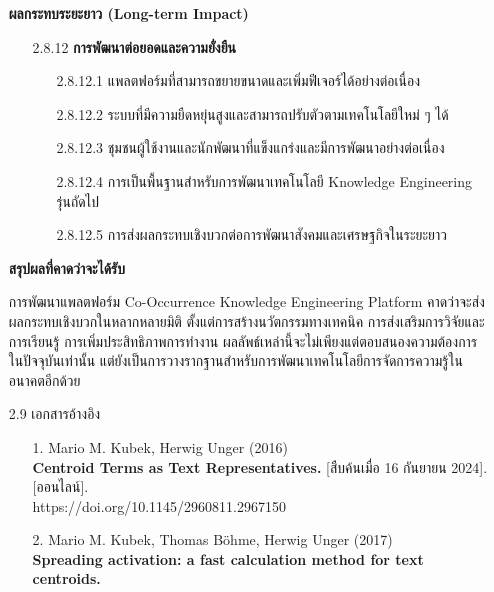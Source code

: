 \documentclass[12pt,a4paper]{article}
\newcommand{\textlight}[1]{{\thailightfont #1}}
\begin{document}
\begin{enumerate}[leftmargin=2cm]
{        \vspace{0.8cm}

        \textbf{ผลกระทบระยะยาว (Long-term Impact)}

        \begin{enumerate}
            \item[2.8.12] \textbf{การพัฒนาต่อยอดและความยั่งยืน}
            \begin{enumerate}
                \item[2.8.12.1] แพลตฟอร์มที่สามารถขยายขนาดและเพิ่มฟีเจอร์ได้อย่างต่อเนื่อง
                \item[2.8.12.2] ระบบที่มีความยืดหยุ่นสูงและสามารถปรับตัวตามเทคโนโลยีใหม่ ๆ ได้
                \item[2.8.12.3] ชุมชนผู้ใช้งานและนักพัฒนาที่แข็งแกร่งและมีการพัฒนาอย่างต่อเนื่อง
                \item[2.8.12.4] การเป็นพื้นฐานสำหรับการพัฒนาเทคโนโลยี Knowledge Engineering รุ่นถัดไป
                \item[2.8.12.5] การส่งผลกระทบเชิงบวกต่อการพัฒนาสังคมและเศรษฐกิจในระยะยาว
            \end{enumerate}
        \end{enumerate}

        \vspace{0.5cm}

        \textbf{สรุปผลที่คาดว่าจะได้รับ}

        \hspace{1cm}การพัฒนาแพลตฟอร์ม Co-Occurrence Knowledge Engineering Platform คาดว่าจะส่งผลกระทบเชิงบวกในหลากหลายมิติ ตั้งแต่การสร้างนวัตกรรมทางเทคนิค การส่งเสริมการวิจัยและการเรียนรู้ การเพิ่มประสิทธิภาพการทำงาน ผลลัพธ์เหล่านี้จะไม่เพียงแต่ตอบสนองความต้องการในปัจจุบันเท่านั้น แต่ยังเป็นการวางรากฐานสำหรับการพัฒนาเทคโนโลยีการจัดการความรู้ในอนาคตอีกด้วย
    }

    \vspace{3cm}

    \item[2.9] เอกสารอ้างอิง
    \\
    \textlight{
        \begin{enumerate}
            \item[1.] Mario M. Kubek, Herwig Unger (2016) \\
            \textbf{Centroid Terms as Text Representatives.}
            [สืบค้นเมื่อ 16 กันยายน 2024]. [ออนไลน์]. \\ https://doi.org/10.1145/2960811.2967150

            \item[2.] Mario M. Kubek, Thomas Böhme, Herwig Unger (2017) \\
            \textbf{Spreading activation: a fast calculation method for text centroids.}


\end{enumerate}}
\end{enumerate}
\end{document}
